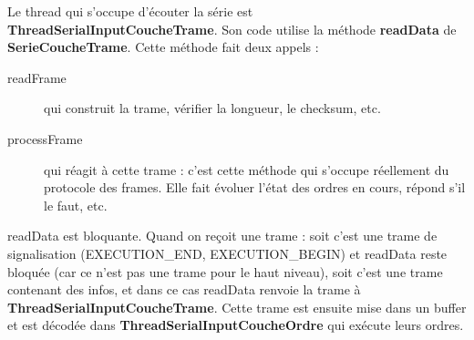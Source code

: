 \documentclass[a4paper, 12pt]{article}
\begin{document}
Le thread qui s'occupe d'écouter la série est \textbf{ThreadSerialInputCoucheTrame}. Son code utilise la méthode \textbf{readData} de \textbf{SerieCoucheTrame}. Cette méthode fait deux appels :
\begin{description}
\item[readFrame] qui construit la trame, vérifier la longueur, le checksum, etc.
\item[processFrame] qui réagit à cette trame : c'est cette méthode qui s'occupe réellement du protocole des frames. Elle fait évoluer l'état des ordres en cours, répond s'il le faut, etc.
\end{description}

readData est bloquante. Quand on reçoit une trame : soit c'est une trame de signalisation (EXECUTION\_END, EXECUTION\_BEGIN) et readData reste bloquée (car ce n'est pas une trame pour le haut niveau), soit c'est une trame contenant des infos, et dans ce cas readData renvoie la trame à \textbf{ThreadSerialInputCoucheTrame}. Cette trame est ensuite mise dans un buffer et est décodée dans \textbf{ThreadSerialInputCoucheOrdre} qui exécute leurs ordres.
\end{document}
